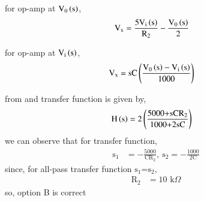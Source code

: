 \documentclass[beamer]{IEEEtran}
\theoremstyle{remark}
\begin{document}
for op-amp at $\text{V}_{\text{0}}\left(\text{s}\right)$, 
\begin{align}
\label{1}
\text{V}_\text{x}&=\frac{5\text{V}_{\text{i}}\left(\text{s}\right)}{\text{R}_2}-\frac{\text{V}_0\left(\text{s}\right)}{2}
\end{align}

for op-amp at $\text{V}_{\text{i}}\left(\text{s}\right)$,
\begin{align}
\label{2}
\text{V}_\text{x}&=\text{sC}\left(\frac{\text{V}_\text{0}\left(\text{s}\right)-\text{V}_\text{i}\left(\text{s}\right)}{1000}\right)
\end{align}

from \brak{\ref{1}} and \brak{\ref{2}} transfer function is given by,
\begin{align}
\text{H}\left(\text{s}\right)&=2\left(\frac{\text{5000+sC$\text{R}_2$}}{\text{1000+2sC}}\right)
\end{align}
we can observe that for transfer function,
\begin{align}
    \text{s}_1&=-\frac{5000}{\text{C$\text{R}_2$}},\ \text{s}_2=-\frac{1000}{\text{2C}}
\end{align}
since, for all-pass transfer function $\text{s}_1$=$\text{s}_2$,
\begin{align}
    \text{R}_2&=\text{10 k}\Omega
\end{align}
so, option B is correct
\end{document}
